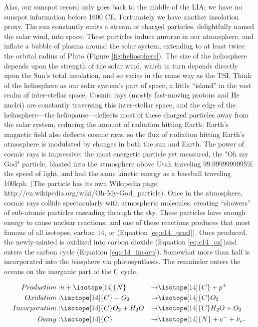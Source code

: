 Alas, our sunspot record only goes back to the middle of the LIA; we have no sunspot information before 1600 CE. Fortunately we have another insolation proxy. The sun constantly emits a stream of charged particles, delightfully named the solar wind, into space. These particles induce aurorae in our atmosphere, and inflate a bubble of plasma around the solar system, extending to at least twice the orbital radius of Pluto (Figure \ref{fig:heliosphere}). The size of the heliosphere depends upon the strength of the solar wind, which in turn depends directly upon the Sun's total insolation, and so varies in the same way as the TSI. Think of the heliosphere as our solar system's part of space, a little ``island'' in the vast realm of inter-stellar space. Cosmic rays (mostly fast-moving protons and He nuclei) are constantly traversing this inter-stellar space, and the edge of the heliosphere---the heliopause---deflects most of these charged particles away from the solar system, reducing the amount of radiation hitting Earth. Earth's magnetic field also deflects cosmic rays, so the flux of radiation hitting Earth's atmosphere is modulated by changes in both the sun and Earth.
The power of cosmic rays is impressive: the most energetic particle yet measured, the  "Oh my God" particle, blasted into the atmosphere above Utah traveling 99.9999999995\% the speed of light, and had the same kinetic energy as a baseball traveling 100kph. (The particle has its own Wikipedia page: http://en.wikipedia.org/wiki/Oh-My-God\_particle). Once in the atmosphere, cosmic rays collide spectacularly with atmospheric molecules, creating ``showers'' of sub-atomic particles cascading through the sky. These particles have enough energy to cause nuclear reactions, and one of these reactions produces that most famous of all isotopes, carbon 14, or   (Equation \ref{eq:c14_prod}). Once produced, the newly-minted  is oxidized into carbon dioxide (Equation \ref{eq:c14_ox})and enters the carbon cycle (Equation \ref{eq:c14_incorp}). Somewhat more than half is incorporated into the biosphere via photosynthesis. The remainder enters the oceans on the inorganic part of the C cycle.
 
\begin{align}
	Production: & n+\isotope[14]{N} & \rightarrow & \isotope[14]{C}+p^+ \label{eq:c14_prod} \\
	Oxidation:  & \isotope[14]{C}+O_2 & \rightarrow & \isotope[14]{C}O_2 \label{eq:c14_ox} \\
	Incorporation: & \isotope[14]{C}O_2+H_2O & \rightarrow & \isotope[14]{C}H_2O+O_2 \label {eq:c14_incorp} \\
	Decay: & \isotope[14]{C}&\rightarrow& \isotope[14]{N} + e^- +\bar{\nu}_{e^-}
\end{align}

